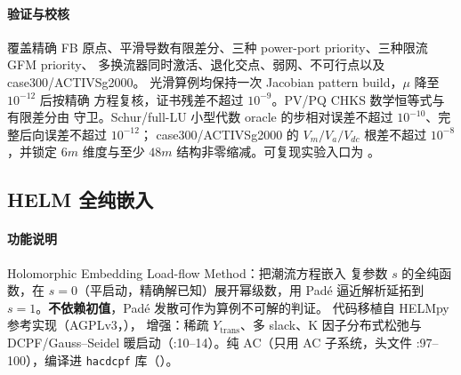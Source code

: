 \paragraph{验证与校核}  覆盖精确 FB
原点、平滑导数有限差分、三种 power-port priority、三种限流 GFM priority、
多换流器同时激活、退化交点、弱网、不可行点以及 case300/ACTIVSg2000。
光滑算例均保持一次 Jacobian pattern build，$\mu$ 降至 $10^{-12}$ 后按精确
方程复核，证书残差不超过 $10^{-9}$。PV/PQ CHKS 数学恒等式与有限差分由
 守卫。Schur/full-LU 小型代数
oracle 的步相对误差不超过 $10^{-10}$、完整后向误差不超过 $10^{-12}$；
case300/ACTIVSg2000 的 $V_m/V_a/V_{dc}$ 根差不超过 $10^{-8}$，并锁定
$6m$ 维度与至少 $48m$ 结构非零缩减。可复现实验入口为
。

\subsection{HELM 全纯嵌入}\label{sec:robust:helm}

\paragraph{功能说明} Holomorphic Embedding Load-flow Method：把潮流方程嵌入
复参数 $s$ 的全纯函数，在 $s=0$（平启动，精确解已知）展开幂级数，用 Padé
逼近解析延拓到 $s=1$。\textbf{不依赖初值}，Padé 发散可作为算例不可解的判证。
代码移植自 HELMpy 参考实现（AGPLv3，），
增强：稀疏 $Y_{\mathrm{trans}}$、多 slack、K 因子分布式松弛与
DCPF/Gauss--Seidel 暖启动（:10--14）。纯 AC（只用 AC 子系统，头文件
:97--100），编译进 \texttt{hacdcpf} 库（）。

